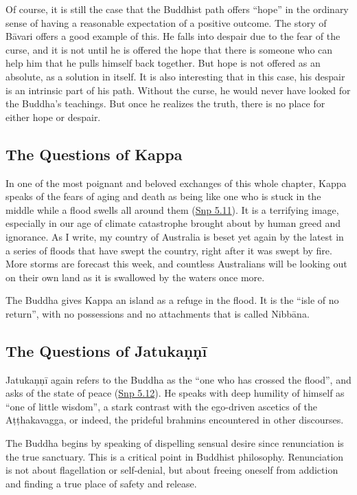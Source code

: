 \documentclass[12pt,openany]{book}%
\begin{document}
Of course, it is still the case that the Buddhist path offers “hope” in the ordinary sense of having a reasonable expectation of a positive outcome. The story of \textsanskrit{Bāvari} offers a good example of this. He falls into despair due to the fear of the curse, and it is not until he is offered the hope that there is someone who can help him that he pulls himself back together. But hope is not offered as an absolute, as a solution in itself. It is also interesting that in this case, his despair is an intrinsic part of his path. Without the curse, he would never have looked for the Buddha’s teachings. But once he realizes the truth, there is no place for either hope or despair.

\subsection*{The Questions of Kappa}

In one of the most poignant and beloved exchanges of this whole chapter, Kappa speaks of the fears of aging and death as being like one who is stuck in the middle while a flood swells all around them (\href{https://suttacentral.net/snp5.11/en/sujato}{Snp 5.11}). It is a terrifying image, especially in our age of climate catastrophe brought about by human greed and ignorance. As I write, my country of Australia is beset yet again by the latest in a series of floods that have swept the country, right after it was swept by fire. More storms are forecast this week, and countless Australians will be looking out on their own land as it is swallowed by the waters once more.

The Buddha gives Kappa an island as a refuge in the flood. It is the “isle of no return”, with no possessions and no attachments that is called \textsanskrit{Nibbāna}.

\subsection*{The Questions of \textsanskrit{Jatukaṇṇī}}

\textsanskrit{Jatukaṇṇī} again refers to the Buddha as the “one who has crossed the flood”, and asks of the state of peace (\href{https://suttacentral.net/snp5.12/en/sujato}{Snp 5.12}). He speaks with deep humility of himself as “one of little wisdom”, a stark contrast with the ego-driven ascetics of the \textsanskrit{Aṭṭhakavagga}, or indeed, the prideful brahmins encountered in other discourses.

The Buddha begins by speaking of dispelling sensual desire since renunciation is the true sanctuary. This is a critical point in Buddhist philosophy. Renunciation is not about flagellation or self-denial, but about freeing oneself from addiction and finding a true place of safety and release.
\end{document}
